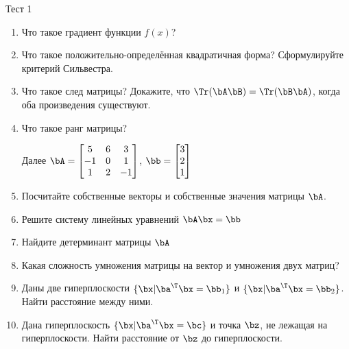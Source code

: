 \documentclass[12pt]{article}
\begin{document}
\begin{center}
\Large
Тест 1
\end{center}
\begin{enumerate}
\item Что такое градиент функции $f(x)$?
\item Что такое положительно-определённая квадратичная форма? Сформулируйте критерий Сильвестра.
\item Что такое след матрицы? Докажите, что $\Tr(\bA\bB) = \Tr(\bB\bA)$, когда оба произведения существуют. 
\item Что такое ранг матрицы?

Далее $\bA =
\begin{bmatrix}
5 & 6 & 3\\
-1 & 0 & 1 \\
1 & 2 & -1
\end{bmatrix} $, $\bb = 
\begin{bmatrix}
3\\
2\\
1
\end{bmatrix}
$
\item Посчитайте собственные векторы и собственные значения матрицы $\bA$.
\item Решите систему линейных уравнений $\bA\bx = \bb$
\item Найдите детерминант матрицы $\bA$
\item Какая сложность умножения матрицы на вектор и умножения двух матриц?
\item Даны две гиперплоскости $\{ \bx | \ba^{\T}\bx = \bb_1\}$ и $\{ \bx | \ba^{\T}\bx = \bb_2\}$. Найти расстояние между ними.
\item Дана гиперплоскость $\{ \bx | \ba^{\T}\bx = \bc \}$ и точка $\bz$, не лежащая на гиперплоскости. 
Найти расстояние от $\bz$ до гиперплоскости. 
\end{enumerate}
\end{document}
